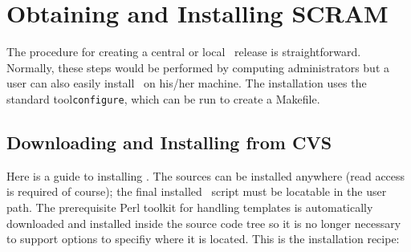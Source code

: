 \chapter{Obtaining and Installing SCRAM}
\label{ch:install}
The procedure for creating a central or local \scram\ release is
straightforward. Normally, these steps would be performed by computing
administrators but a user can also easily install \scram\ on his/her machine.
The installation uses the standard tool\texttt{configure}, which can be run to create a Makefile.

\section{Downloading and Installing from CVS}

Here is a guide to installing \scram. The sources can be installed
anywhere (read access is required of course); the final installed
\scram\ script must be locatable in the user path. The prerequisite
Perl toolkit for handling templates is automatically downloaded and
installed inside the source code tree so it is no longer necessary to
support options to specifiy where it is located. This is the
installation recipe:

